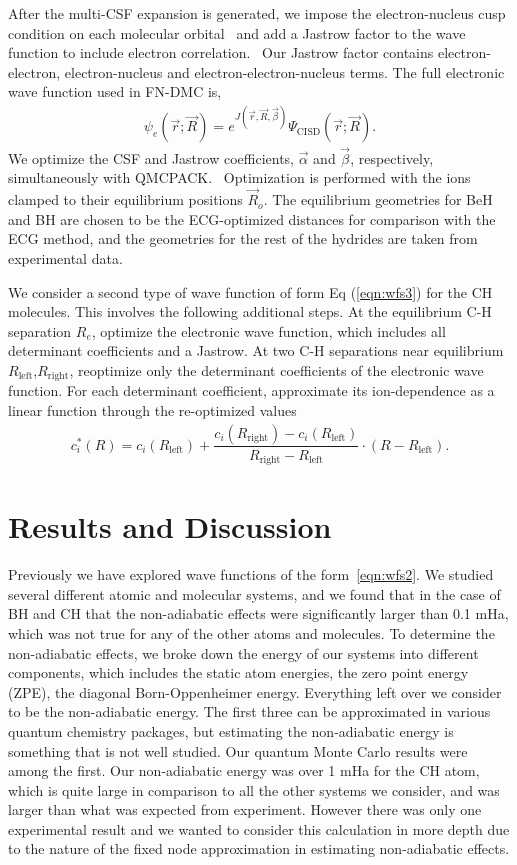 \documentclass[aip,jcp,numerical,reprint]{revtex4-1}
\begin{document}
After the multi-CSF expansion is generated, we impose the electron-nucleus cusp condition on each molecular orbital~\cite{cusp} and add a Jastrow factor to the wave function to include electron correlation.~\cite{Kato} Our Jastrow factor contains electron-electron, electron-nucleus and electron-electron-nucleus terms. The full electronic wave function used in FN-DMC is,
\begin{align}
\psi_e(\vec{r};\vec{R})=e^{J(\vec{r},\vec{R},\vec{\beta})}\Psi_{\text{CISD}}(\vec{r};\vec{R})\label{eq:psie}.
\end{align}
We optimize the CSF and Jastrow coefficients, $\vec{\alpha}$ and $\vec{\beta}$, respectively, simultaneously with QMCPACK.~\cite{QMCPACK_Kim,QMCPACK_Esler} Optimization is performed with the ions clamped to their equilibrium positions $\vec{R}_o$. The equilibrium geometries for BeH and BH are chosen to be the ECG-optimized distances for comparison with the ECG  method, and the geometries for the rest of the hydrides are taken from experimental data.

We consider a second type of wave function of form Eq (\ref{eqn:wfs3}) for the CH molecules.  This involves the following additional steps. At the equilibrium C-H separation $R_e$, optimize the electronic wave function, which includes all determinant coefficients and a Jastrow. At two C-H separations near equilibrium $R_{\text{left}}$,$R_{\text{right}}$, reoptimize only the determinant coefficients of the electronic wave function. For each determinant coefficient, approximate its ion-dependence as a linear function through the re-optimized values
\begin{align}
c_i^*(R) = c_i(R_{\text{left}}) + 
\dfrac{c_i(R_{\text{right}}) - c_i(R_{\text{left}})}{R_{\text{right}}-R_{\text{left}}}\cdot(R-R_{\text{left}}).
\end{align}

\section{Results and Discussion}

Previously we have explored wave functions of the form~\eqref{eqn:wfs2}.  We studied several different atomic and molecular systems, and we found that in the case of BH and CH that the non-adiabatic effects were  significantly larger than 0.1 mHa, which was not true for any of the other atoms and molecules.  To determine the non-adiabatic effects, we broke down the energy of our systems into different components, which includes the static atom energies, the zero point energy (ZPE), the diagonal Born-Oppenheimer energy.   Everything left over we consider to be the non-adiabatic energy.   The first three can be approximated in various quantum chemistry packages, but estimating the non-adiabatic energy is something that is not well studied. Our quantum Monte Carlo results were among the first.  Our non-adiabatic energy was over 1 mHa for the CH atom, which is quite large in comparison to all the other systems we consider, and was larger than what was expected from experiment.  However there was only one experimental result and we wanted to consider this calculation in more depth due to the nature of the fixed node approximation in estimating non-adiabatic effects.
\end{document}
